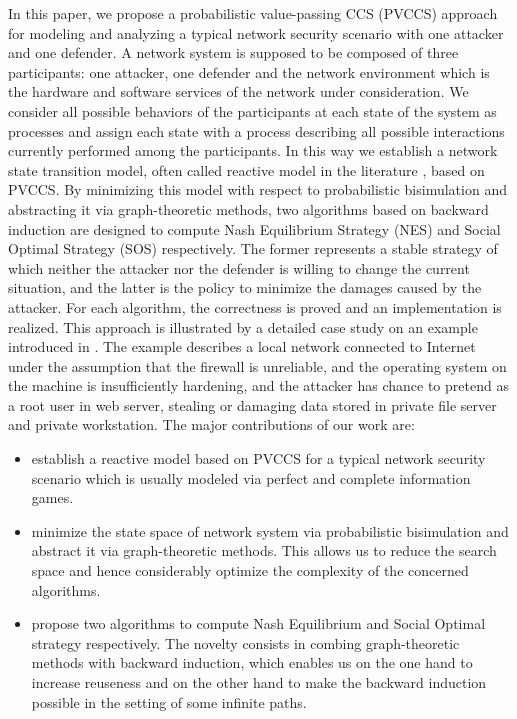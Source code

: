 \documentclass{acm_proc_article-sp}
\begin{document}
In this paper, we propose a probabilistic value-passing CCS (PVCCS) approach for modeling and analyzing a typical network security scenario with one attacker and one defender.
A network system is supposed to be composed of three participants: one attacker, one defender and the network environment which is the hardware and software services of the network under consideration. We consider all possible behaviors of the participants at each state of the system as processes and assign each state with a process describing all possible interactions currently performed among the participants.
In this way we establish  a network state transition model, often called reactive model in the literature \cite{rob}, based on PVCCS.
By minimizing this model with respect to probabilistic bisimulation and abstracting it via graph-theoretic methods,
two algorithms based on backward induction are designed to compute Nash Equilibrium Strategy (NES) \cite{xiannuan, jean,ls} and Social Optimal Strategy (SOS) \cite{rd,david} respectively.
The former represents a stable strategy of which neither the attacker nor the defender is willing to change the current situation, and
the latter is the policy to minimize the damages caused by the attacker. For each algorithm, the correctness  is proved and an implementation is realized. This approach is illustrated by a detailed case study on an example introduced in \cite{klye}. The example
describes a local network connected to Internet under the assumption that the firewall is unreliable, and the operating system on the machine is insufficiently hardening, and the attacker has chance to pretend as a root user in web server, stealing or damaging data stored in private file server and private workstation.
The major contributions of our work are:
\begin{itemize}
\item
establish a reactive model based on PVCCS for a typical network security scenario
which is usually modeled via perfect and complete information games.
\item
minimize the state space of network system via probabilistic bisimulation and abstract it via graph-theoretic methods.
This allows us to reduce the search space and hence considerably optimize the complexity of the concerned algorithms.

\item
propose two algorithms to compute Nash Equilibrium and Social Optimal strategy respectively.
The novelty consists in combing graph-theoretic methods with backward induction,  which  enables us on the one hand to increase reuseness and on the other hand to make the backward induction possible in the setting of some infinite paths.
\end{itemize}
\end{document}
